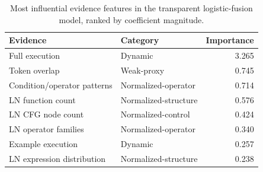 \begin{table}[!htbp]
\centering
\scriptsize
\begin{tabular}{llr}
\toprule
Evidence & Category & Importance \\
\midrule
Full execution & Dynamic & 3.265 \\
Token overlap & Weak-proxy & 0.745 \\
Condition/operator patterns & Normalized-operator & 0.714 \\
LN function count & Normalized-structure & 0.576 \\
LN CFG node count & Normalized-control & 0.424 \\
LN operator families & Normalized-operator & 0.340 \\
Example execution & Dynamic & 0.257 \\
LN expression distribution & Normalized-structure & 0.238 \\
\bottomrule
\end{tabular}
\vspace{0.5em}
\caption{Most influential evidence features in the transparent logistic-fusion model, ranked by coefficient magnitude.}
\label{tab:evidence-importance}
\end{table}
